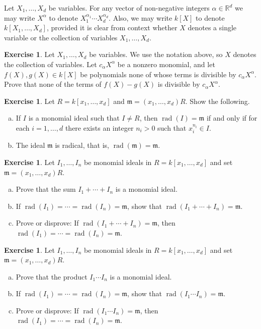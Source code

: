 \documentclass{amsart}
\theoremstyle{plain}
\theoremstyle{definition}
\newtheorem{exercise}[theorem]{Exercise}
\theoremstyle{definition}
\DeclareMathOperator{\radname}{rad}
\newcommand{\rad}[1]{\radname(#1)}
\newcommand{\m}{\mathfrak{m}}
\newcommand{\R}{\mathbb{R}}
\begin{document}
Let $X_1, \dots, X_d$ be variables.
For any vector of non-negative integers $\alpha \in \R^d$
we may write $X^\alpha$ to denote $X_1^{\alpha_1} \cdots X_d^{\alpha_d}$.
Also, we may write $k[X]$ to denote $k[X_1,\dots,X_d]$,
provided it is clear from context whether $X$ denotes a single variable
or the collection of variables $X_1,\dots,X_d$.


\begin{exercise}
Let $X_1, \dots, X_d$ be variables. We use the notation above, so $X$ denotes
the collection of variables.
Let $c_{\alpha}X^{\alpha}$ be a nonzero monomial,
and let $f(X), g(X) \in k[X]$ be polynomials
none of whose terms is divisible by $c_{\alpha}X^{\alpha}$.
Prove that none of the terms of $f(X) - g(X)$
is divisible by $c_{\alpha}X^{\alpha}$. 
\end{exercise}


\begin{exercise} 
Let $R=k[x_1,\ldots,x_d]$ and $\m=(x_1,\ldots,x_d)R$. Show the following.
\begin{enumerate}[a.]
\item If $I$ is a monomial ideal such that $I\neq R$, then $\rad{I}=\m$ if and
only if for each $i=1,\ldots,d$ there exists an integer $n_i>0$ such
that $x_i^{n_i}\in I$.
\item The ideal $\m$ is radical, that is, $\rad{\m} = \m$.
\end{enumerate}
\end{exercise}


\begin{exercise} 
Let $I_1,\ldots,I_n$ be monomial ideals in $R=k[x_1,\ldots,x_d]$ and
set $\m=(x_1,\ldots,x_d)R$.
\begin{enumerate}[a.]
\item Prove that the sum $I_1+\cdots+ I_n$ is a monomial ideal.
\item If $\rad{I_1}=\cdots=\rad{I_n}=\m$, show that $\rad{I_1+\cdots+ I_n}=\m$.
\item Prove or disprove:  If $\rad{I_1+\cdots+ I_n}=\m$, then $\rad{I_1}=\cdots=\rad{I_n}=\m$.
\end{enumerate}
\end{exercise}


\begin{exercise} 
Let $I_1,\ldots,I_n$ be monomial ideals in $R=k[x_1,\ldots,x_d]$ and
set $\m=(x_1,\ldots,x_d)R$.
\begin{enumerate}[a.]
\item Prove that the product $I_1\cdots I_n$ is a monomial ideal.
\item If $\rad{I_1}=\cdots=\rad{I_n}=\m$, show that $\rad{I_1\cdots I_n}=\m$.
\item Prove or disprove:  If $\rad{I_1\cdots I_n}=\m$, then $\rad{I_1}=\cdots=\rad{I_n}=\m$.
\end{enumerate}
\end{exercise}
\end{document}
